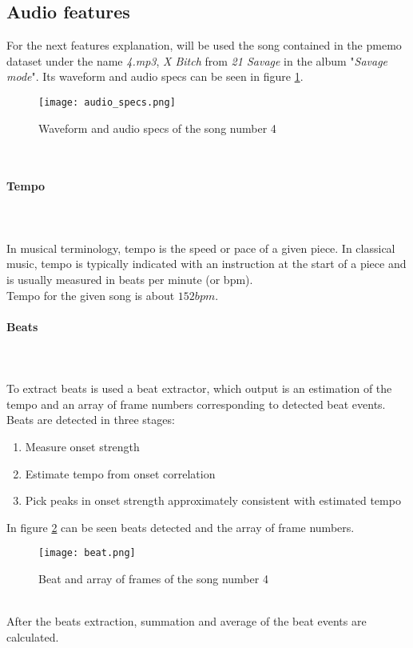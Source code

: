 \subsection{Audio features}
For the next features explanation, will be used the song contained in the \gls{pmemo} dataset under the name \textit{4.mp3}, \textit{X Bitch} from \textit{21 Savage} in the album "\textit{Savage mode}". Its waveform and audio specs can be seen in figure \ref{fig:audio_specs}.
\begin{figure}[h]
    \centering
    \texttt{[image: audio\_specs.png]} 
	\caption{Waveform and audio specs of the song number 4}
    \label{fig:audio_specs}
\end{figure}
\\
\paragraph{Tempo}
\mbox{} \\ \\
In musical terminology, tempo  is the speed or pace of a given piece. In classical music, tempo is typically indicated with an instruction at the start of a piece and is usually measured in beats per minute (or bpm).
\\
Tempo for the given song is about $152 bpm$.

\paragraph{Beats}
\mbox{} \\ \\
To extract beats is used a beat extractor, which output is an estimation of the tempo and an array of frame numbers corresponding to detected beat events.
\\
Beats are detected in three stages:
\begin{enumerate}	
	\item Measure onset strength
	\item Estimate tempo from onset correlation
	\item Pick peaks in onset strength approximately consistent with estimated tempo
\end{enumerate}
In figure \ref{fig:beat} can be seen beats detected and the array of frame numbers.
\begin{figure}[h]
    \centering
    \texttt{[image: beat.png]} 
	\caption{Beat and array of frames of the song number 4}
    \label{fig:beat}
\end{figure}
\\
After the beats extraction, summation and average of the beat events are calculated.


